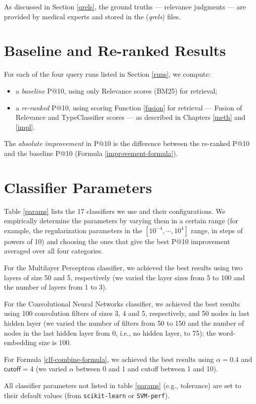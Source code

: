 As discussed in Section \ref{qrels}, the ground truths --- relevance judgments --- are provided by medical experts
and stored in the (\emph{qrels}) files.

\section{Baseline and Re-ranked Results}
For each of the four query runs listed in Section \ref{runs}, we compute:
\begin{itemize}
 \item a \emph{baseline} P@10, using only \textsf{Relevance} scores (BM25) for retrieval;
 \item a \emph{re-ranked} P@10,
 using scoring Function \ref{fusion} for retrieval --- \textsf{Fusion} of \textsf{Relevance} and \textsf{TypeClassifier} scores ---
 as described in Chapters \ref{meth} and \ref{impl}.
\end{itemize}
The \emph{absolute improvement} in P@10 is the difference between the re-ranked P@10 and the baseline P@10 (Formula \ref{improvement-formula}).

\section{Classifier Parameters}
Table \ref{params} lists the 17 classifiers we use and their configurations.
We empirically determine
the
parameters by varying them in a certain range (for example, the regularization parameters
in the $[10^{-4},\cdots,10^4]$ range, in steps of powers of 10) and choosing the ones
that give the
best P@10 improvement averaged over all four categories.

For the Multilayer Perceptron classifier, we achieved the best results using two layers of size 50 and 5, respectively
(we varied the layer sizes from 5 to 100 and the number of layers from 1 to 3).

For the Convolutional Neural Networks classifier, we achieved the best results
using 100 convolution filters of sizes 3, 4 and 5, respectively, and 50 nodes in last hidden layer
(we varied the number of filters from 50 to 150
and the number of nodes in the last hidden layer from 0, i.e., no hidden layer, to 75); the word-embedding size is 100.

For Formula \ref{clf-combine-formula}, we achieved the best results using
$\alpha=0.4$ and $\textsf{cutoff}=4$ (we varied $\alpha$  between 0 and 1 and \textsf{cutoff} between 1 and 10).

All classifier parameters not listed in table \ref{params} (e.g., tolerance) are set to their default values (from \texttt{scikit-learn} or \texttt{SVM-perf}).

